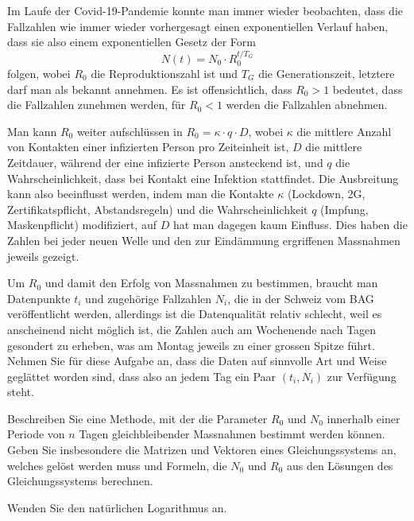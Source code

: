 Im Laufe der Covid-19-Pandemie konnte man immer wieder beobachten, dass
die Fallzahlen wie immer wieder vorhergesagt einen exponentiellen
Verlauf haben, dass sie also einem exponentiellen Gesetz der Form
\begin{equation}
N(t) = N_0\cdot  R_0^{t/T_G}
\label{60000031:funktion}
\end{equation}
folgen, wobei $R_0$ die Reproduktionszahl ist und $T_G$ die
Generationszeit, letztere darf man als bekannt annehmen.
Es ist offensichtlich, dass $R_0>1$ bedeutet, dass die Fallzahlen
zunehmen werden, für $R_0<1$ werden die Fallzahlen abnehmen.

Man kann $R_0$ weiter aufschlüssen in $R_0=\kappa\cdot q\cdot D$, wobei
$\kappa$ die mittlere Anzahl von Kontakten einer infizierten Person
pro Zeiteinheit ist, $D$ die mittlere Zeitdauer, während der eine
infizierte Person ansteckend ist, und $q$ die Wahrscheinlichkeit, dass
bei Kontakt eine Infektion stattfindet.
Die Ausbreitung kann also beeinflusst werden, indem man die Kontakte
$\kappa$ (Lockdown, 2G, Zertifikatspflicht, Abstandsregeln)
und die Wahrscheinlichkeit $q$ (Impfung, Maskenpflicht)
modifiziert, auf $D$ hat man dagegen kaum Einfluss.
Dies haben die Zahlen bei jeder neuen Welle und den zur Eindämmung
ergriffenen Massnahmen jeweils gezeigt.

Um $R_0$ und damit den Erfolg von Massnahmen zu bestimmen,
braucht man Datenpunkte $t_i$ und zugehörige Fallzahlen $N_i$, die in der
Schweiz vom BAG veröffentlicht werden, allerdings ist die Datenqualität
relativ schlecht, weil es anscheinend nicht möglich ist, die Zahlen auch
am Wochenende nach Tagen gesondert zu erheben, was am Montag jeweils zu
einer grossen Spitze führt.
Nehmen Sie für diese Aufgabe an, dass die Daten auf sinnvolle Art und
Weise geglättet worden sind, dass also an jedem Tag ein Paar
$(t_i,N_i)$ zur Verfügung steht.

Beschreiben Sie eine Methode, mit der die Parameter
$R_0$ und $N_0$
innerhalb einer Periode von $n$ Tagen
gleichbleibender Massnahmen bestimmt werden können.
Geben Sie insbesondere die Matrizen und Vektoren eines Gleichungssystems
an, welches gelöst werden muss und Formeln, die $N_0$ und $R_0$ aus
den Lösungen des Gleichungssystems berechnen.

\begin{hinweis}
Wenden Sie den natürlichen Logarithmus an.
\end{hinweis}


